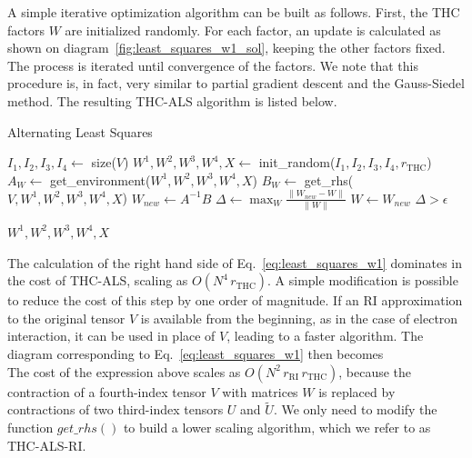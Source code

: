 A simple iterative optimization algorithm can be built as follows.
First, the THC factors $W$ are initialized randomly.  For each factor,
an update is calculated as shown on diagram~\ref{fig:least_squares_w1_sol}, 
keeping the other factors fixed.  The process is iterated until convergence of 
the factors. We note that this procedure is, in fact, very similar to 
partial gradient descent and the Gauss-Siedel method.\cite{yoon1988lower} The 
resulting THC-ALS algorithm is listed below.

\begin{algorithm}[H]
  \caption{Alternating Least Squares}\label{code:thc_als}
  \begin{algorithmic}[1] 
  \State $I_{1},I_{2},I_{3},I_{4} \gets$ size($V$)
  \State $W^1, W^2, W^3, W^4, X \gets$ init\_random($I_{1}, I_{2}, I_{3}, 
I_{4}, r_\mathrm{THC}$) 
  \Repeat {}
  \State $A_{W} \gets $ get\_environment($W^1, W^2, W^3, W^4, X$)
  \State $B_{W} \gets $ get\_rhs($V,
   W^1, W^2, W^3, W^4, X$) 
   \State $W_{new} \gets A^{-1} B$
   \EndFor
   \State $\Delta \gets \max_{W} \frac{\| W_{new} - W \|}{\|
W \|}$
   \State $W \gets W_{new}$ 
   \Until $\Delta > \epsilon$ 
   
   \Return $W^1, W^2, W^3, W^4, X$
    \EndFunction
  \end{algorithmic}
\end{algorithm}
%
The calculation of the right hand side of
Eq.~\ref{eq:least_squares_w1} dominates in the cost of THC-ALS,
scaling as $O(N^4 \, r_\mathrm{THC})$. A simple modification is
possible to reduce the cost of this step by one order of magnitude. If an
RI approximation to the original tensor $V$ is available from the beginning, as 
in the case of electron interaction, it can be used in place of $V$, leading to 
a faster algorithm. The diagram corresponding to 
Eq.~\ref{eq:least_squares_w1} then becomes
%
\begin{equation}
\label{fig:least_squares_w1_sol_ri}
\end{equation}
%
The cost of the expression above scales as $O(N^2 \,
r_\mathrm{RI} \, r_\mathrm{THC})$, because the contraction of a
fourth-index tensor $V$ with matrices $W$ is replaced by contractions
of two third-index tensors $U$ and $\tilde{U}$. We only need to
modify the function $get\_rhs()$ to build a lower scaling algorithm,
which we refer to as THC-ALS-RI.

